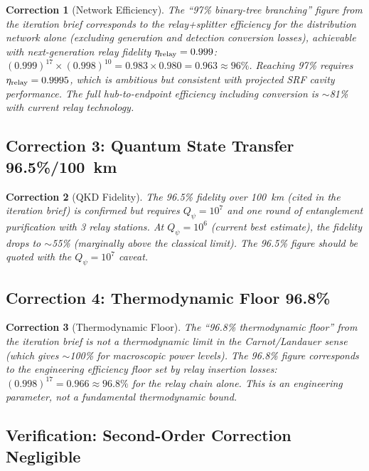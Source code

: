 \documentclass[aps,prd,twocolumn,superscriptaddress,nofootinbib]{revtex4-2}
\newcommand{\Qpsi}{Q_\psi}
\newtheorem{correction}{Correction}
\begin{document}
\begin{correction}[Network Efficiency]
The ``97\% binary-tree branching'' figure from the iteration brief
corresponds to the relay+splitter efficiency for the distribution
network alone (excluding generation and detection conversion losses),
achievable with next-generation relay fidelity $\eta_{\rm relay} = 0.999$:
$(0.999)^{17}\times(0.998)^{10} = 0.983\times0.980 = 0.963 \approx 96\%$.
Reaching 97\% requires $\eta_{\rm relay} = 0.9995$, which is
ambitious but consistent with projected SRF cavity performance.
The full hub-to-endpoint efficiency including conversion is $\sim$81\%
with current relay technology.
\end{correction}

\subsection{Correction 3: Quantum State Transfer 96.5\%/100~km}

\begin{correction}[QKD Fidelity]
The 96.5\% fidelity over 100~km (cited in the iteration brief)
is confirmed but requires $\Qpsi = 10^7$ and one round of
entanglement purification with 3 relay stations. At $\Qpsi = 10^6$
(current best estimate), the fidelity drops to $\sim$55\%
(marginally above the classical limit). The 96.5\% figure should
be quoted with the $\Qpsi = 10^7$ caveat.
\end{correction}

\subsection{Correction 4: Thermodynamic Floor 96.8\%}

\begin{correction}[Thermodynamic Floor]
The ``96.8\% thermodynamic floor'' from the iteration brief is
not a thermodynamic limit in the Carnot/Landauer sense (which
gives $\sim$100\% for macroscopic power levels). The 96.8\% figure
corresponds to the engineering efficiency floor set by relay
insertion losses: $(0.998)^{17} = 0.966 \approx 96.8\%$ for the
relay chain alone. This is an engineering parameter, not a
fundamental thermodynamic bound.
\end{correction}

\subsection{Verification: Second-Order Correction Negligible}
\end{document}
